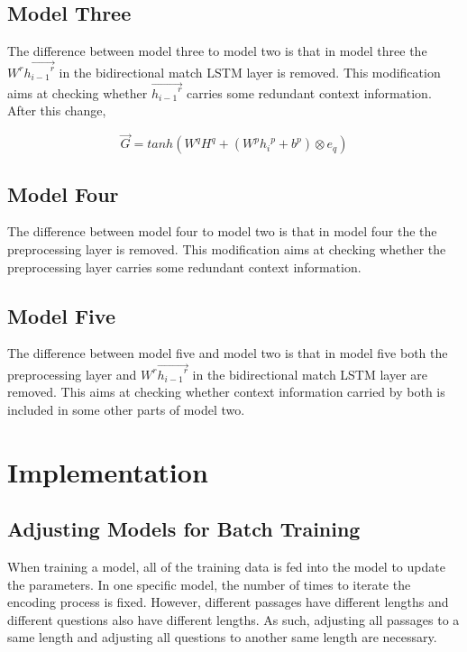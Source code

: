 \documentclass[modernstyle,12pt]{sjsuthesis}
\theoremstyle{definition}
\begin{document}
\section{Model Three}

The difference between model three to model two is that in model three the $W^r\overrightarrow{{h_{i-1}}^r}$ in the bidirectional match LSTM layer is removed. This modification aims at checking whether $\overrightarrow{{h_{i-1}}^r}$ carries some redundant context information. After this change,


$$\overrightarrow{G} = tanh(W^qH^q + (W^p{h_i}^p + b^p) \otimes e_q)$$


\section{Model Four}

The difference between model four to model two is that in model four the the preprocessing layer is removed. This modification aims at checking whether the preprocessing layer carries some redundant context information.

\section{Model Five}

The difference between model five and model two is that in model five both the preprocessing layer and $W^r\overrightarrow{{h_{i-1}}^r}$ in the bidirectional match LSTM layer are removed. This aims at checking whether context information carried by both is included in some other parts of model two.

\chapter{Implementation}

\section{Adjusting Models for Batch Training}\label{sect:padding}

When training a model, all of the training data is fed into the model to update the parameters. In one specific model, the number of times to iterate the encoding process is fixed. However, different passages have different lengths and different questions also have different lengths. As such, adjusting all passages to a same length and adjusting all questions to another same length are necessary.
\end{document}
